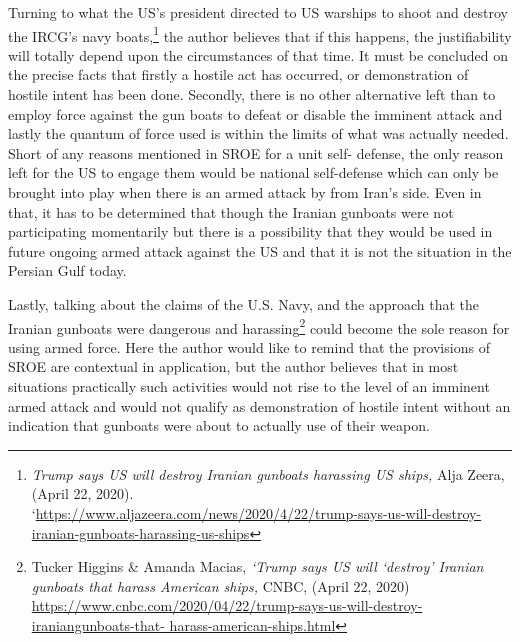 \begin{multicols}{2}
\noi
Turning to what the US’s president directed to US warships to shoot and destroy the IRCG’s
navy boats,\footnote{\textit{Trump says US will destroy Iranian gunboats harassing US ships,} Alja Zeera, (April 22, 2020).\\
‘\url{https://www.aljazeera.com/news/2020/4/22/trump-says-us-will-destroy-iranian-gunboats-harassing-us-ships}} the author believes that if this happens, the justifiability will totally depend
upon the circumstances of that time. It must be concluded on the precise facts that firstly a hostile
act has occurred, or demonstration of hostile intent has been done. Secondly, there is no
other alternative left than to employ force against the gun boats to defeat or disable the
imminent attack and lastly the quantum of force used is within the limits of what was
actually needed. Short of any reasons mentioned in SROE for a unit self- defense, the only reason left for the US to engage them would be national self-defense which can only be
brought into play when there is an armed attack by from Iran’s side. Even in that, it has to
be determined that though the Iranian gunboats were not participating momentarily but
there is a possibility that they would be used in future ongoing armed attack against the US
and that it is not the situation in the Persian Gulf today.

\noi
Lastly, talking about the claims of the U.S. Navy, and the approach that the Iranian
gunboats were dangerous and harassing\footnote{Tucker Higgins \& Amanda Macias, \textit{‘Trump says US will ‘destroy’ Iranian gunboats that harass American
ships,} CNBC, (April 22, 2020) \url{https://www.cnbc.com/2020/04/22/trump-says-us-will-destroy-iraniangunboats-that- harass-american-ships.html}} could become the sole reason for using armed
force. Here the author would like to remind that the provisions of SROE are contextual in
application, but the author believes that in most situations practically such activities would
not rise to the level of an imminent armed attack and would not qualify as demonstration of
hostile intent without an indication that gunboats were about to actually use of their
weapon.



\end{multicols}
